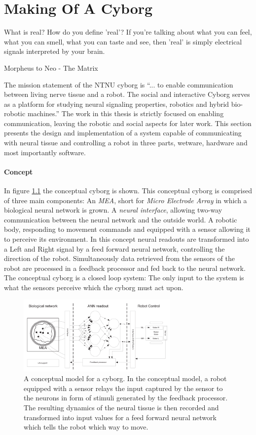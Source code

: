 \chapter{Making Of A Cyborg}
\epigraph{What is real? How do you define 'real'? If you're talking about what
you can feel, what you can smell, what you can taste and see, then 'real' is
simply electrical signals interpreted by your brain.}
{Morpheus to Neo - The Matrix}
The mission statement of the NTNU cyborg is ``... to enable communication
between living nerve tissue and a robot. The social and interactive Cyborg
serves as a platform for studying neural signaling properties, robotics and
hybrid bio-robotic machines.'' \cite{ntnu_cyborg}
The work in this thesis is strictly focused on enabling communication, leaving
the robotic and social aspects for later work.
This section presents the design and implementation of a system capable of
communicating with neural tissue and controlling a robot in three parts,
wetware, hardware and most importantly software.
\subsubsection{Concept}
In figure \ref{figOverviewSimple} the conceptual cyborg is shown.
This conceptual cyborg is comprised of three main components: An \emph{MEA}, short
for \emph{Micro Electrode Array} in which a biological neural network is grown.
A \emph{neural interface}, allowing two-way communication between the neural network and
the outside world.
A robotic body, responding to movement commands and equipped with a sensor
allowing it to perceive its environment.
In this concept neural readouts are transformed into a Left and Right signal by
a feed forward neural network, controlling the direction of the robot.
Simultaneously data retrieved from the sensors of the robot are processed in a
feedback processor and fed back to the neural network.
The conceptual cyborg is a closed loop system: The only input to the system is
what the sensors perceive which the cyborg must act upon.
\begin{figure}[h!]
  \centering
  \includegraphics[width=0.7\textwidth]{fig/cyborg_overview.png}
  \caption{
    A conceptual model for a cyborg.
    In the conceptual model, a robot equipped with a sensor relays the input
    captured by the sensor to the neurons in form of stimuli generated by the
    feedback processor.
    The resulting dynamics of the neural tissue is then recorded and transformed
    into input values for a feed forward neural network which tells the robot
    which way to move. 
  }
  \label{figOverviewSimple}
\end{figure}

